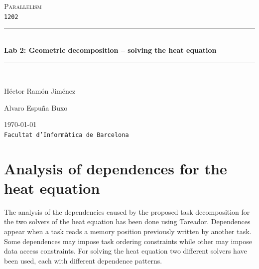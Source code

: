 \documentclass[a4paper,11pt]{article}
\begin{document}
\begin{titlepage}
\begin{center}
\textsc{\Large Parallelism}
\\
\texttt{1202}
\\[1.5cm]
\rule{\linewidth}{0.5mm}
\\[0.4cm]
{\huge
\bfseries
Lab 2: Geometric decomposition – solving the heat equation
\\[0.4cm]
}
\rule{\linewidth}{0.5mm}
\\[2.5cm]
\begin{minipage}{0.4\textwidth}
\begin{flushleft}
\large
Héctor Ramón Jiménez
\end{flushleft}
\end{minipage}
\begin{minipage}{0.4\textwidth}
\begin{flushright}
\large
Alvaro Espuña Buxo
\end{flushright}
\end{minipage}
\vfill
{\large
\today
}
\\
{\large
\texttt{Facultat d'Informàtica de Barcelona}
}
\end{center}
\end{titlepage}
\section{Analysis of dependences for the heat equation}
The analysis of the dependencies caused by the proposed task
decomposition for the two solvers of the heat equation has been done
using Tareador. Dependences appear when a task reads a memory position
previously written by another task. Some dependences may impose task
ordering constraints while other may impose data access
constraints. For solving the heat equation two different solvers have
been used, each with different dependence patterns.
\end{document}
